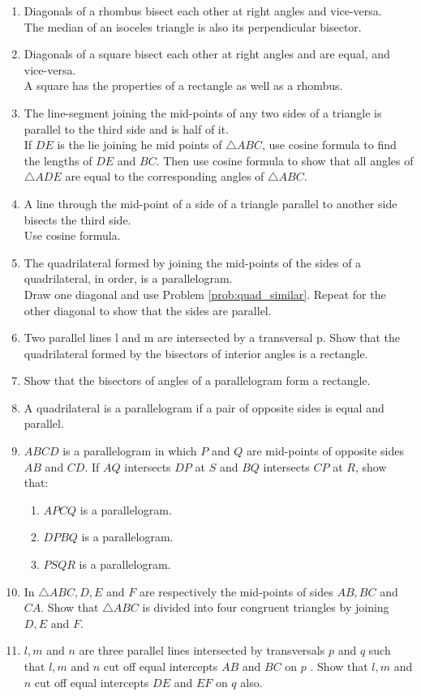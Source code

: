 \begin{enumerate}[label=\arabic*.,ref=\thesubsection.\theenumi]
%
\item  Diagonals of a rhombus bisect each other at right angles and vice-versa. 
%
\\
\solution The median of an isoceles triangle is also its perpendicular bisector.
%
\item  Diagonals of a square bisect each other at right angles and are equal, and vice-versa. 
%
\\
\solution A square has the properties of a rectangle as well as a rhombus.
%
\item  The line-segment joining the mid-points of any two sides of a triangle is parallel to the third side and is half of it.
\label{prob:quad_similar}
%
\\
\solution If $DE$ is the lie joining he mid points of $\triangle ABC$,  use cosine formula to find the lengths of $DE$ and $BC$. Then use cosine formula to show that all angles of $\triangle ADE$ are equal to the corresponding angles of $\triangle ABC$.
%
\item  A line through the mid-point of a side of a triangle parallel to another side bisects the third side.
\\
\solution Use cosine formula.
%
\item  The quadrilateral formed by joining the mid-points of the sides of a quadrilateral, in order, is a parallelogram.
%
\\
\solution Draw one diagonal and use Problem \eqref{prob:quad_similar}.  Repeat for the other diagonal to show that the sides are parallel.
%
\item Two parallel lines l and m are intersected by a transversal p. Show that the quadrilateral formed by the bisectors of interior angles is a rectangle.
%
\item Show that the bisectors of angles of a parallelogram form a rectangle.
%
\item A quadrilateral is a parallelogram if a pair of opposite sides is equal and parallel.
%
\item $ABCD$ is a parallelogram in which $P$ and $Q$ are mid-points of opposite sides $AB$ and $CD$. If $AQ$ intersects $DP$ at $S$ and $BQ$ intersects $CP$ at $R$, show that: 
%
\begin{enumerate}
\item  $APCQ$ is a parallelogram. 
\item $DPBQ$ is a parallelogram. 
\item $PSQR$ is a parallelogram.
\end{enumerate}
%
\item In $\triangle ABC, D, E$ and $F$ are respectively the mid-points of sides $AB, BC$ and $CA $. Show that $\triangle ABC$ is divided into four congruent triangles by joining $D, E$ and $F$.
\item $l, m$ and $n$ are three parallel lines intersected by transversals $p$ and $q$ such that $l, m$ and $n$ cut off equal intercepts $AB$ and $BC$ on $p$ . Show that $l, m$ and $n$ cut off equal intercepts $DE$ and $EF$ on $q$ also.
%


\end{enumerate}

